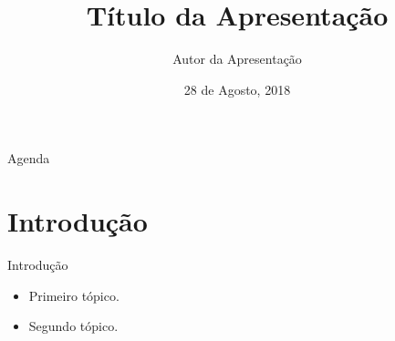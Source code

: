 \documentclass{beamer}
\title{Título da Apresentação}
\author{Autor da Apresentação}
\date{28 de Agosto, 2018}
\institute
{
  Universidade Federal do Rio de Janeiro\\
  DEE/UFRJ
}
\begin{document}
{
\begin{frame}
  \bigskip\bigskip\bigskip\bigskip
  \titlepage
\end{frame}
}

\begin{frame}{Agenda}
  \tableofcontents
\end{frame}

\section{Introdução}

\begin{frame}{Introdução}
  \begin{itemize}
  \item {
    Primeiro tópico.
    \pause
  }
  \item {
    Segundo tópico.
  }
  \end{itemize}
\end{frame}
\end{document}
